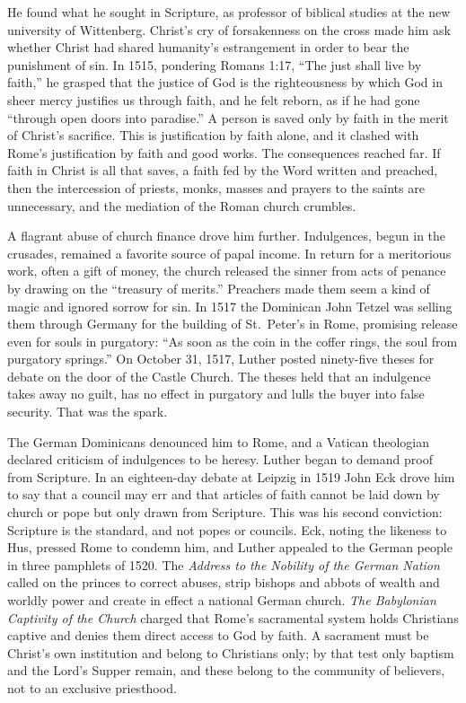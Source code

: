 He found what he sought in Scripture, as professor of biblical studies at the new university of
Wittenberg. Christ's cry of forsakenness on the cross made him ask whether Christ had shared
humanity's estrangement in order to bear the punishment of sin. In 1515, pondering Romans 1:17, ``The
just shall live by faith,'' he grasped that the justice of God is the righteousness by which God in
sheer mercy justifies us through faith, and he felt reborn, as if he had gone ``through open doors
into paradise.'' A person is saved only by faith in the merit of Christ's sacrifice. This is
justification by faith alone, and it clashed with Rome's justification by faith and good works. The consequences reached far. If faith in Christ is all that saves, a faith fed by the Word
written and preached, then the intercession of priests, monks, masses and prayers to the saints are
unnecessary, and the mediation of the Roman church crumbles.

A flagrant abuse of church finance drove him further. Indulgences, begun in the crusades, remained a
favorite source of papal income. In return for a meritorious work, often a gift of money, the church
released the sinner from acts of penance by drawing on the ``treasury of merits.'' Preachers made
them seem a kind of magic and ignored sorrow for sin. In 1517 the Dominican John Tetzel was selling
them through Germany for the building of St.~Peter's in Rome, promising release even for souls in
purgatory: ``As soon as the coin in the coffer rings, the soul from purgatory springs.'' On October
31, 1517, Luther posted ninety-five theses for debate on the door of the Castle Church. The theses held that an indulgence takes away no guilt, has no effect in purgatory and lulls the buyer into false security.
That was the spark.

The German Dominicans denounced him to Rome, and a Vatican theologian declared criticism of
indulgences to be heresy. Luther began to demand proof from Scripture. In an eighteen-day debate at
Leipzig in 1519 John Eck drove him to say that a council may err and that articles of faith cannot be laid down by church or pope but only drawn from Scripture. This was his second conviction: Scripture is the standard, and not popes or councils. Eck, noting the likeness to Hus, pressed Rome to
condemn him, and Luther appealed to the German people in three pamphlets of 1520. The \emph{Address to
the Nobility of the German Nation} called on the princes to correct abuses, strip bishops and abbots
of wealth and worldly power and create in effect a national German church. \emph{The Babylonian
Captivity of the Church} charged that Rome's sacramental system holds Christians captive and denies
them direct access to God by faith. A sacrament must be Christ's own institution and belong to Christians only; by that test only baptism and the Lord's Supper remain, and these belong to the community
of believers, not to an exclusive priesthood.

